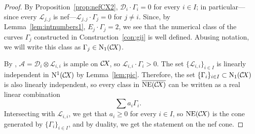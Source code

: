 \documentclass[10pt,a4paper]{article}
\numberwithin{equation}{section}
\theoremstyle{definition}
\theoremstyle{remark}
\def\cA{{\mathcal A}}
\def\cD{{\mathcal D}}
\def\cL{{\mathcal L}}
\def\operatorname#1{\mathop{\rm #1}\nolimits}
\def\NE{{\operatorname{NE}}}
\def\Nu{{\operatorname{N_1}}}
\def\NU{{\operatorname{N^1}}}
\def\CX{\mathcal{C}\!X\hspace{-0.5pt}}
\begin{document}
\begin{proof} By Proposition~\ref{prop:nefCX2},  $\cD_i \cdot \Gamma_i=0$ for every $i \in I$; in particular---since every $\cL_{j,j}$ is nef---$\cL_{j,j}\cdot \Gamma_j=0$ for $j\neq i$. Since, by Lemma~\ref{lem:intnumbers1}, $E_j \cdot \Gamma_j=2$, we see that the numerical class of the curves $\Gamma_j$ constructed in Construction~\ref{con:gij} is well defined. Abusing notation, we will write this class as $\Gamma_j\in\Nu(\CX)$.

By \cite[Lemma 6.4]{WORS6}, $\cA=\cD_i \otimes \cL_{i,i}$ is ample on $\CX$, so $\cL_{i,i} \cdot \Gamma_i >0$. 
The set $\{\cL_{i,i}\}_{i \in I}$ is linearly independent in $\NU(\CX)$ by Lemma~\ref{lem:pic}. Therefore, the set $\{\Gamma_i\}_{i \in I}\subset \Nu(\CX)$ is also linearly independent, so every class in $\overline{\NE(\CX)}$ can be written as a real linear combination 
\[
\sum a_i\Gamma_i.
\]
Intersecting with $\cL_{i,i}$, we get that $a_i \ge 0$ for every $i \in I$, so $\NE(\CX)$ is the cone generated by  $\{\Gamma_i\}_{i \in I}$, and by duality,  we get the statement on the nef cone.
\end{proof}
\end{document}
